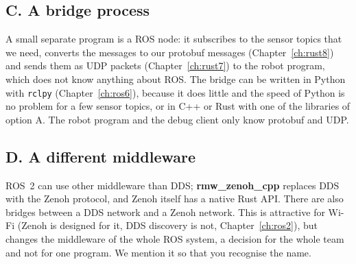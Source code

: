 \subsection*{C. A bridge process}
A small separate program is a ROS node: it subscribes to the sensor topics that we need, converts the messages to our protobuf messages (Chapter~\ref{ch:rust8}) and sends them as UDP packets (Chapter~\ref{ch:rust7}) to the robot program, which does not know anything about ROS. The bridge can be written in Python with \verb!rclpy! (Chapter~\ref{ch:ros6}), because it does little and the speed of Python is no problem for a few sensor topics, or in C++ or Rust with one of the libraries of option A. The robot program and the debug client only know protobuf and UDP.

\subsection*{D. A different middleware}
ROS~2 can use other middleware than DDS; \textbf{rmw\_zenoh\_cpp} replaces DDS with the Zenoh protocol, and Zenoh itself has a native Rust API. There are also bridges between a DDS network and a Zenoh network. This is attractive for Wi-Fi (Zenoh is designed for it, DDS discovery is not, Chapter~\ref{ch:ros2}), but changes the middleware of the whole ROS system, a decision for the whole team and not for one program. We mention it so that you recognise the name.

